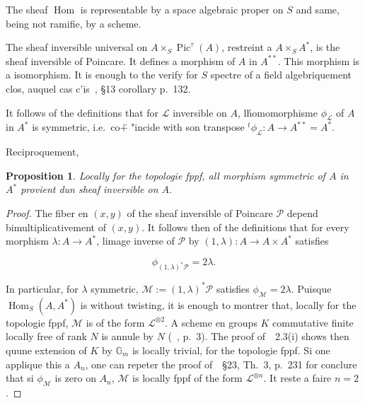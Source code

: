 \documentclass[11pt,a4paper]{article}
\theoremstyle{plain}
\newtheorem{proposition}[theorem]{Proposition}
\theoremstyle{definition}
\DeclareMathOperator{\Hom}{Hom}
\DeclareMathOperator{\Pic}{Pic}
\begin{document}
The sheaf $\Hom$ is representable by a space algebraic proper on $S$ and
same, being not ramifie, by a scheme.

The sheaf inversible universal on $A \times_S \Pic^\tau(A)$, restreint a $A \times_S A^*$, is the
sheaf inversible of Poincare. It defines a morphism of $A$ in $A^{**}$. This
morphism is a isomorphism. It is enough to the verify for $S$ spectre of a
field algebriquement clos, auquel cas c'is~\cite{AV}, \S13 corollary p.~132.


It follows of the definitions that for $\mathscr{L}$ inversible on $A$, l\'homomorphisme $\phi_{\mathscr{L}}$
of $A$ in $A^*$ is symmetric, i.e.~co\"  + "{i}ncide with son transpose ${}^t\phi_{\mathscr{L}}: A \to A^{**} = A^*$.

Reciproquement,

\begin{proposition}
Locally for the topologie fppf, all morphism symmetric of $A$ in $A^*$ provient dun sheaf inversible on $A$.
\end{proposition}

\begin{proof}
The fiber en $(x,y)$ of the sheaf inversible of Poincare $\mathscr{P}$ depend
bimultiplicativement of $(x,y)$. It follows then of the definitions that for every
morphism $\lambda: A \to A^*$, limage inverse of $\mathscr{P}$ by $(1, \lambda): A \to A \times A^*$ satisfies

\begin{equation}
\phi_{(1,\lambda)^*\mathscr{P}} = 2\lambda.
\end{equation}

In particular, for $\lambda$ symmetric, $\mathscr{M} := (1, \lambda)^*\mathscr{P}$ satisfies $\phi_{\mathscr{M}} = 2\lambda$. Puisque
$\Hom_S(A, A^*)$ is without twisting, it is enough to montrer that, locally for the
topologie fppf, $\mathscr{M}$ is of the form $\mathscr{L}^{\otimes 2}$. A scheme en groups $K$ commutative
finite locally free of rank $N$ is annule by $N$ (~\cite{OortTate}, p.~3). The proof
of~\cite{Breen}~2.3(i) shows then quune extension of $K$ by $\mathbb{G}_m$ is locally trivial,
for the topologie fppf. Si one applique this a $A_n$, one can repeter the proof
of~\cite{AV}~\S23, Th.~3, p.~231 for conclure that si $\phi_{\mathscr{M}}$ is zero on $A_n$, $\mathscr{M}$ is
locally fppf of the form $\mathscr{L}^{\otimes n}$. It reste a faire $n=2$.
\end{proof}


\subsection{}
\end{document}
